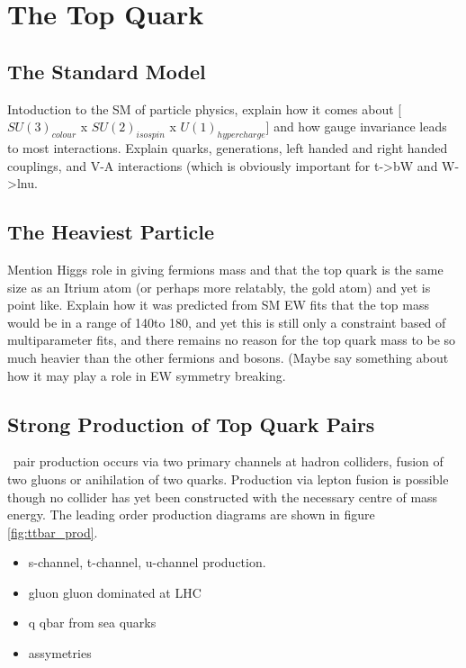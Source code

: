 \chapter{The Top Quark}
\label{Chapter:TheTopQuark}

\section{The Standard Model}
Intoduction to the SM of particle physics, explain how it comes about [$SU(3)_{colour}$ x $SU(2)_{isospin}$ x $U(1)_{hypercharge}$] and how gauge invariance leads to most interactions. Explain quarks, generations, left handed and right handed couplings, and V-A interactions (which is obviously important for t->bW and W->lnu.

\section{The Heaviest Particle}
Mention Higgs role in giving fermions mass and that the top quark is the same size as an Itrium atom (or perhaps more relatably, the gold atom) and yet is point like. Explain how it was predicted from SM EW fits that the top mass would be in a range of 140\GeV to 180\GeV, and yet this is still only a constraint based of multiparameter fits, and there remains no reason for the top quark mass to be so much heavier than the other fermions and bosons. (Maybe say something about how it may play a role in EW symmetry breaking.

\section{Strong Production of Top Quark Pairs}
\ttbar\ pair production occurs via two primary channels at hadron colliders, fusion of two gluons or anihilation of two quarks. Production via lepton fusion is possible though no collider has yet been constructed with the necessary centre of mass energy. The leading order production diagrams are shown in figure \ref{fig:ttbar_prod}.

\begin{itemize}
  \item s-channel, t-channel, u-channel production.
  \item gluon gluon dominated at LHC
  \item q qbar from sea quarks
  \item assymetries
\end{itemize}

